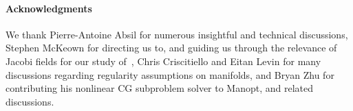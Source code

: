 








\paragraph{Acknowledgments}
We thank Pierre-Antoine Absil for numerous insightful and technical discussions, Stephen McKeown for directing us to, and guiding us through the relevance of Jacobi fields for our study of~, Chris Criscitiello and Eitan Levin for many discussions regarding regularity assumptions on manifolds, and Bryan Zhu for contributing his nonlinear CG subproblem solver to Manopt, and related discussions.






